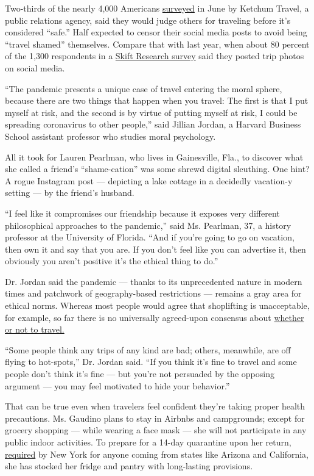 Two-thirds of the nearly 4,000 Americans
\href{https://www.ketchum.com/travel-economic-development/}{surveyed} in
June by Ketchum Travel, a public relations agency, said they would judge
others for traveling before it's considered ``safe.'' Half expected to
censor their social media posts to avoid being ``travel shamed''
themselves. Compare that with last year, when about 80 percent of the
1,300 respondents in a
\href{https://research.skift.com/wp-content/uploads/2019/03/ExperientialTraveler2019.pdf}{Skift
Research survey} said they posted trip photos on social media.

``The pandemic presents a unique case of travel entering the moral
sphere, because there are two things that happen when you travel: The
first is that I put myself at risk, and the second is by virtue of
putting myself at risk, I could be spreading coronavirus to other
people,'' said Jillian Jordan, a Harvard Business School assistant
professor who studies moral psychology.

All it took for Lauren Pearlman, who lives in Gainesville, Fla., to
discover what she called a friend's ``shame-cation'' was some shrewd
digital sleuthing. One hint? A rogue Instagram post --- depicting a lake
cottage in a decidedly vacation-y setting --- by the friend's husband.

``I feel like it compromises our friendship because it exposes very
different philosophical approaches to the pandemic,'' said Ms. Pearlman,
37, a history professor at the University of Florida. ``And if you're
going to go on vacation, then own it and say that you are. If you don't
feel like you can advertise it, then obviously you aren't positive it's
the ethical thing to do.''

Dr. Jordan said the pandemic --- thanks to its unprecedented nature in
modern times and patchwork of geography-based restrictions --- remains a
gray area for ethical norms. Whereas most people would agree that
shoplifting is unacceptable, for example, so far there is no universally
agreed-upon consensus about
\href{https://www.nytimes3xbfgragh.onion/interactive/2020/07/31/travel/coronavirus-travel-risk.html}{whether
or not to travel.}

``Some people think any trips of any kind are bad; others, meanwhile,
are off flying to hot-spots,'' Dr. Jordan said. ``If you think it's fine
to travel and some people don't think it's fine --- but you're not
persuaded by the opposing argument --- you may feel motivated to hide
your behavior.''

That can be true even when travelers feel confident they're taking
proper health precautions. Ms. Gaudino plans to stay in Airbnbs and
campgrounds; except for grocery shopping --- while wearing a face mask
--- she will not participate in any public indoor activities. To prepare
for a 14-day quarantine upon her return,
\href{https://www.nytimes3xbfgragh.onion/2020/06/24/nyregion/ny-coronavirus-states-quarantine.html}{required}
by New York for anyone coming from states like Arizona and California,
she has stocked her fridge and pantry with long-lasting provisions.

